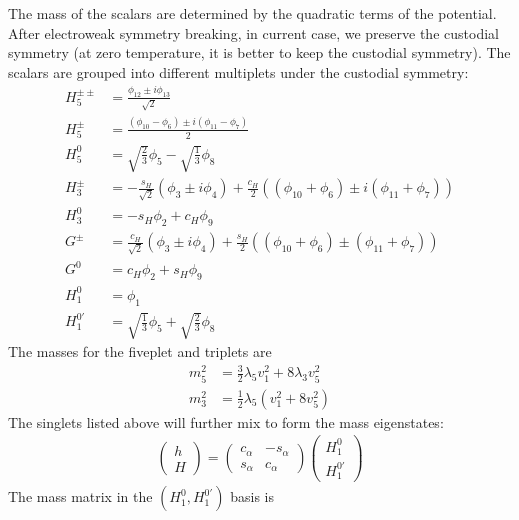 \documentclass[12pt]{article}
\begin{document}
The mass of the scalars are determined by the quadratic terms of the potential. After electroweak symmetry breaking, in current case, we preserve the custodial symmetry (at zero temperature, it is better to keep the custodial symmetry). The scalars are grouped into different multiplets under the custodial symmetry:
\begin{subequations}
    \begin{align}
        H_5^{\pm\pm} &= \frac{\phi_{12}\pm i\phi_{13}}{\sqrt{2}}\\
        H_5^\pm &= \frac{(\phi_{10}-\phi_6) \pm i(\phi_{11}-\phi_7)}{2}\\
        H_5^0 &= \sqrt{\frac{2}{3}}\phi_5 - \sqrt{\frac{1}{3}}\phi_8\\
        H_3^\pm &= - \frac{s_H}{\sqrt{2}}(\phi_3\pm i\phi_4) + \frac{c_H}{2}((\phi_{10}+\phi_6)\pm i(\phi_{11}+\phi_7))\\
        H_3^0 &= -s_H \phi_2 + c_H \phi_9\\
        G^\pm &= \frac{c_H}{\sqrt{2}}(\phi_3\pm i\phi_4)+\frac{s_H}{2}((\phi_{10}+\phi_6)\pm(\phi_{11}+\phi_7))\\
        G^0 &= c_H \phi_2 + s_H \phi_9\\
        H_1^0 &= \phi_1 \\
        H_1^{0\prime} &= \sqrt{\frac{1}{3}}\phi_5 + \sqrt{\frac{2}{3}}\phi_8
    \end{align}
\end{subequations}
The masses for the fiveplet and triplets are
\begin{align}
    m_5^2 &= \frac{3}{2}\lambda_5 v_1^2 + 8\lambda_3 v_5^2\\
    m_3^2 &= \frac{1}{2}\lambda_5 (v_1^2 + 8 v_5^2)
\end{align}
The singlets listed above will further mix to form the mass eigenstates:
\begin{align}
\label{equ:mixing_singlet}
\begin{pmatrix}
    h\\
    H
\end{pmatrix} = \begin{pmatrix}
    c_\alpha & -s_\alpha \\
    s_\alpha & c_\alpha
\end{pmatrix}\begin{pmatrix}
    H_1^0\\
    H_1^{0\prime}
\end{pmatrix}
\end{align}
The mass matrix in the $(H_1^0, H_1^{0\prime})$ basis is
\end{document}
